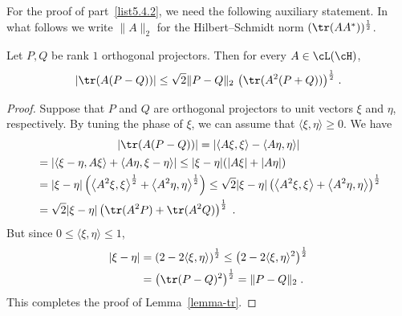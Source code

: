For the proof of part~\eqref{list5.4.2}, we need the following auxiliary statement. In what follows we write $\|A\|_2$ for the Hilbert--Schmidt norm $(\tr(AA^*))^{\frac{1}{2}}$.

\begin{lemm}\label{lemma-tr}
Let $P,Q$ be rank $1$ orthogonal projectors.
Then for every $A \in \cL(\cH)$,
\[
|\tr (A(P-Q))| \leq \sqrt{2}\|P-Q\|_2 \ \big(\tr (A^2(P+Q))\big)^{\frac{1}{2}}\;.
\]
\end{lemm}

\begin{proof}
Suppose that $P$ and $Q$ are orthogonal projectors to
unit vectors $\xi$ and $\eta$, respectively. By tuning the phase of $\xi$, we can assume that $\langle \xi, \eta \rangle \geq 0$. We have
\begin{multline*}
|\tr (A(P-Q))| = |\langle A\xi,\xi\rangle - \langle A\eta,\eta\rangle|
\\
\begin{aligned}
&= |\langle \xi-\eta, A\xi \rangle + \langle A\eta, \xi-\eta \rangle |\leq |\xi-\eta| (|A\xi|+|A\eta|)
\\
&= |\xi-\eta|\left(\left\langle A^2\xi,\xi\right\rangle^{\frac{1}{2}} + \left\langle A^2\eta,\eta\right\rangle^{\frac{1}{2}}\right) \leq \sqrt{2}|\xi-\eta|\left(\left\langle A^2\xi,\xi\right\rangle + \left\langle A^2\eta,\eta\right\rangle\right)^{\frac{1}{2}}
\\
&=\sqrt{2}|\xi-\eta|\left(\tr(A^2P)+\tr(A^2Q)\right)^{\frac{1}{2}} \;.
\end{aligned}
\end{multline*}
But since $0 \leq \langle \xi, \eta \rangle \leq 1$,
\begin{align*}
|\xi-\eta| &= \left(2 -2\langle \xi, \eta \rangle\right)^{\frac{1}{2}} \leq \left(2 -2\langle \xi, \eta \rangle^2\right)^{\frac{1}{2}}
\\
&= \left(\tr(P-Q)^2\right)^{\frac{1}{2}} = \|P-Q\|_2\;.
\end{align*}
This completes the proof of Lemma~\ref{lemma-tr}.
\end{proof}


